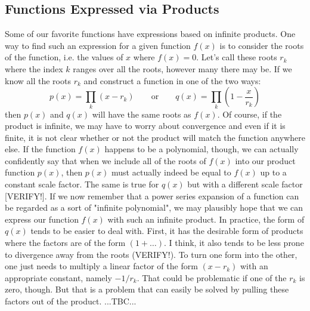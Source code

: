 









\subsection{Functions Expressed via Products}
Some of our favorite functions have expressions based on infinite products. One way to find such an expression for a given function $f(x)$ is to consider the roots of the function, i.e. the values of $x$ where $f(x) = 0$. Let's call these roots $r_k$ where the index $k$ ranges over all the roots, however many there may be. If we know all the roots $r_k$ and construct a function in one of the two ways:
\begin{equation}
 p(x) = \prod_{k} (x - r_k)  \qquad \text{or} \qquad
 q(x) = \prod_{k} (1 - \frac{x}{r_k})
\end{equation}
then $p(x)$ and $q(x)$ will have the same roots as $f(x)$. Of course, if the product is infinite, we may have to worry about convergence and even if it is finite, it is not clear whether or not the product will match the function anywhere else. If the function $f(x)$ happens to be a polynomial, though, we can actually confidently say that when we include all of the roots of $f(x)$ into our product function $p(x)$, then $p(x)$ must actually indeed be equal to $f(x)$ up to a constant scale factor. The same is true for $q(x)$ but with a different scale factor [VERIFY!]. If we now remember that a power series expansion of a function can be regarded as a sort of "infinite polynomial", we may plausibly hope that we can express our function $f(x)$ with such an infinite product. In practice, the form of $q(x)$ tends to be easier to deal with. First, it has the desirable form of products where the factors are of the form $(1 + \ldots)$. I think, it also tends to be less prone to divergence away from the roots (VERIFY!). To turn one form into the other, one just needs to multiply a linear factor of the form $(x - r_k)$ with an appropriate constant, namely $-1 / r_k$. That could be problematic if one of the $r_k$ is zero, though. But that is a problem that can easily be solved by pulling these factors out of the product. ...TBC...

